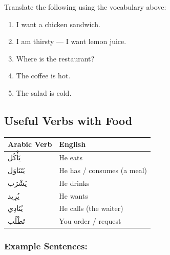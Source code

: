 \documentclass[
  a4paper,
  DIV=11,
  numbers=noendperiod]{scrartcl}
\providecommand{\tightlist}{%
  \setlength{\itemsep}{0pt}\setlength{\parskip}{0pt}}
\begin{document}
\begin{tcolorbox}[enhanced jigsaw, bottomrule=.15mm, arc=.35mm, colbacktitle=quarto-callout-note-color!10!white, opacityback=0, toptitle=1mm, title=\textcolor{quarto-callout-note-color}{\faInfo}\hspace{0.5em}{Try This!}, colframe=quarto-callout-note-color-frame, opacitybacktitle=0.6, colback=white, coltitle=black, titlerule=0mm, left=2mm, toprule=.15mm, bottomtitle=1mm, rightrule=.15mm, leftrule=.75mm, breakable]

Translate the following using the vocabulary above:

\begin{enumerate}
\def\labelenumi{\arabic{enumi}.}
\tightlist
\item
  I want a chicken sandwich.\\
\item
  I am thirsty --- I want lemon juice.\\
\item
  Where is the restaurant?\\
\item
  The coffee is hot.\\
\item
  The salad is cold.
\end{enumerate}

\end{tcolorbox}

\subsection{Useful Verbs with Food}\label{useful-verbs-with-food}

\begin{longtable}[]{@{}ll@{}}
\toprule\noalign{}
Arabic Verb & English \\
\midrule\noalign{}
\endhead
\bottomrule\noalign{}
\endlastfoot
يَأْكُل & He eats \\
يَتَنَاوَل & He has / consumes (a meal) \\
يَشْرَب & He drinks \\
يُرِيد & He wants \\
يُنَادِي & He calls (the waiter) \\
تَطْلُب & You order / request \\
\end{longtable}

\subsubsection{Example Sentences:}\label{example-sentences}
\end{document}
